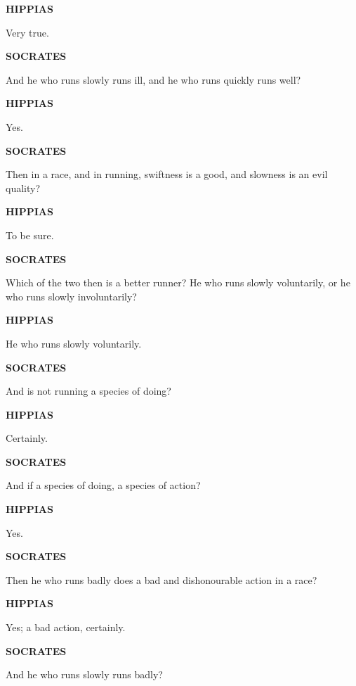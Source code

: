 \documentclass[11pt,letter]{article}
\begin{document}
\par \textbf{HIPPIAS}
\par   Very true.

\par \textbf{SOCRATES}
\par   And he who runs slowly runs ill, and he who runs quickly runs well?

\par \textbf{HIPPIAS}
\par   Yes.

\par \textbf{SOCRATES}
\par   Then in a race, and in running, swiftness is a good, and slowness is an evil quality?

\par \textbf{HIPPIAS}
\par   To be sure.

\par \textbf{SOCRATES}
\par   Which of the two then is a better runner? He who runs slowly voluntarily, or he who runs slowly involuntarily?

\par \textbf{HIPPIAS}
\par   He who runs slowly voluntarily.

\par \textbf{SOCRATES}
\par   And is not running a species of doing?

\par \textbf{HIPPIAS}
\par   Certainly.

\par \textbf{SOCRATES}
\par   And if a species of doing, a species of action?

\par \textbf{HIPPIAS}
\par   Yes.

\par \textbf{SOCRATES}
\par   Then he who runs badly does a bad and dishonourable action in a race?

\par \textbf{HIPPIAS}
\par   Yes; a bad action, certainly.

\par \textbf{SOCRATES}
\par   And he who runs slowly runs badly?
\end{document}

